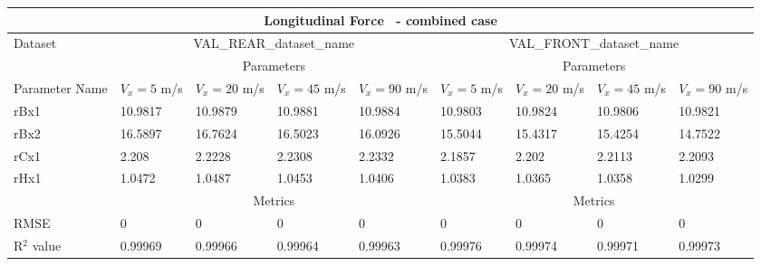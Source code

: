         \begin{tabular}{lllll|llll} \hline \multicolumn{9}{c}{Longitudinal Force~ - combined case}                                                                                                                                                                    \\ \hline Dataset                         & \multicolumn{4}{c|}{VAL\_REAR\_dataset\_name}                                                & \multicolumn{4}{c}{VAL\_FRONT\_dataset\_name}                                                     \\ \hline \multicolumn{1}{c}{}            & \multicolumn{4}{c|}{Parameters}                                                              & \multicolumn{4}{c}{Parameters}                                                                    \\ \hline Parameter Name                  & $V_x = 5$ m/s     & $V_x = 20$ m/s     & $V_x = 45$ m/s     & $V_x = 90$ m/s     & $V_x = 5$ m/s      & $V_x = 20$ m/s      & $V_x = 45$ m/s      & $V_x = 90$ m/s       \\ rBx1                            & 10.9817 & 10.9879 & 10.9881 & 10.9884 & 10.9803 & 10.9824 & 10.9806 & 10.9821  \\ rBx2                            & 16.5897 & 16.7624 & 16.5023 & 16.0926 & 15.5044 & 15.4317 & 15.4254 & 14.7522  \\ rCx1                            & 2.208 & 2.2228 & 2.2308 & 2.2332 & 2.1857 & 2.202 & 2.2113 & 2.2093  \\ rHx1                            & 1.0472 & 1.0487 & 1.0453 & 1.0406 & 1.0383 & 1.0365 & 1.0358 & 1.0299  \\ \hline \multicolumn{1}{c}{}            & \multicolumn{4}{c|}{Metrics}                                                                 & \multicolumn{4}{c}{Metrics}                                                                       \\ \hline RMSE                            & 0 & 0 & 0 & 0 & 0 & 0 & 0 & 0  \\ R$^2$ value                       & 0.99969   & 0.99966   & 0.99964   & 0.99963   & 0.99976   & 0.99974   & 0.99971   & 0.99973    \\ \hline \end{tabular} 